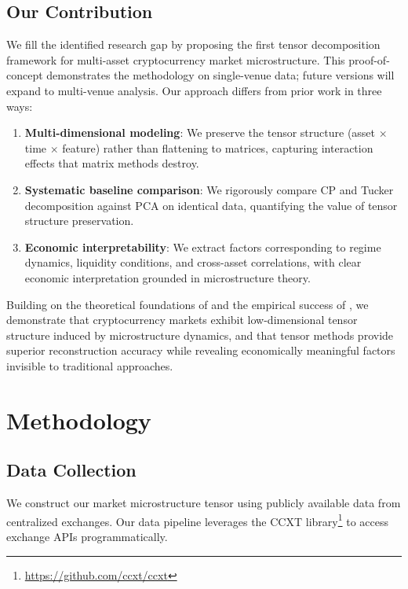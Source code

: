 \documentclass{article}
\begin{document}
\subsection{Our Contribution}

We fill the identified research gap by proposing the first tensor decomposition framework for multi-asset cryptocurrency market microstructure. This proof-of-concept demonstrates the methodology on single-venue data; future versions will expand to multi-venue analysis. Our approach differs from prior work in three ways:

\begin{enumerate}[leftmargin=*]
    \item \textbf{Multi-dimensional modeling}: We preserve the tensor structure (asset $\times$ time $\times$ feature) rather than flattening to matrices, capturing interaction effects that matrix methods destroy.
    \item \textbf{Systematic baseline comparison}: We rigorously compare CP and Tucker decomposition against PCA on identical data, quantifying the value of tensor structure preservation.
    \item \textbf{Economic interpretability}: We extract factors corresponding to regime dynamics, liquidity conditions, and cross-asset correlations, with clear economic interpretation grounded in microstructure theory.
\end{enumerate}

Building on the theoretical foundations of \citet{Babii2023Tensor} and the empirical success of \citet{Lettau2024ThreeD}, we demonstrate that cryptocurrency markets exhibit low-dimensional tensor structure induced by microstructure dynamics, and that tensor methods provide superior reconstruction accuracy while revealing economically meaningful factors invisible to traditional approaches.

\section{Methodology}
\label{sec:methodology}

\subsection{Data Collection}

We construct our market microstructure tensor using publicly available data from centralized exchanges. Our data pipeline leverages the CCXT library\footnote{\url{https://github.com/ccxt/ccxt}} to access exchange APIs programmatically.
\end{document}
